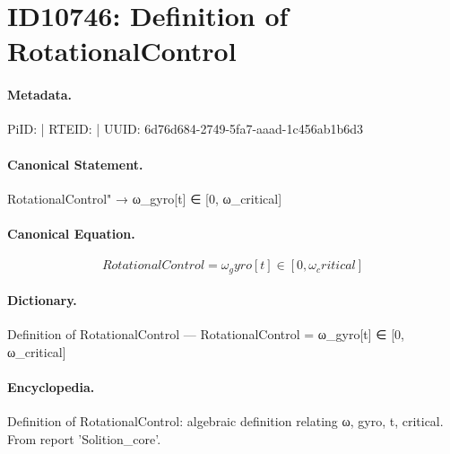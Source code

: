 \section*{ID10746: Definition of RotationalControl}
\paragraph{Metadata.}
PiID:  | RTEID:  | UUID: 6d76d684-2749-5fa7-aaad-1c456ab1b6d3

\paragraph{Canonical Statement.}
RotationalControl" → ω\_gyro[t] ∈ [0, ω\_critical]

\paragraph{Canonical Equation.}
\[
RotationalControl = ω_gyro[t] ∈ [0, ω_critical]
\]

\paragraph{Dictionary.}
Definition of RotationalControl — RotationalControl = ω\_gyro[t] ∈ [0, ω\_critical]

\paragraph{Encyclopedia.}
Definition of RotationalControl: algebraic definition relating ω, gyro, t, critical. From report 'Solition\_core'.
